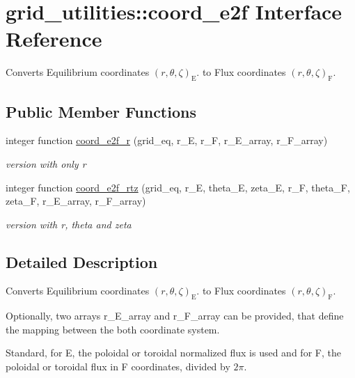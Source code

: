 \hypertarget{interfacegrid__utilities_1_1coord__e2f}{}\section{grid\+\_\+utilities\+:\+:coord\+\_\+e2f Interface Reference}
\label{interfacegrid__utilities_1_1coord__e2f}


Converts Equilibrium coordinates $\left(r,\theta,\zeta\right)_\text{E}$. to Flux coordinates $\left(r,\theta,\zeta\right)_\text{F}$.  


\subsection*{Public Member Functions}
\begin{DoxyCompactItemize}
\item 
integer function \hyperlink{interfacegrid__utilities_1_1coord__e2f_a234992ee60b4bb51361a58522234a5cc}{coord\+\_\+e2f\+\_\+r} (grid\+\_\+eq, r\+\_\+E, r\+\_\+F, r\+\_\+\+E\+\_\+array, r\+\_\+\+F\+\_\+array)
\begin{DoxyCompactList}\small\item\em version with only r \end{DoxyCompactList}\item 
integer function \hyperlink{interfacegrid__utilities_1_1coord__e2f_aa4cc89261b595ef43acdb171c448e7d5}{coord\+\_\+e2f\+\_\+rtz} (grid\+\_\+eq, r\+\_\+E, theta\+\_\+E, zeta\+\_\+E, r\+\_\+F, theta\+\_\+F, zeta\+\_\+F, r\+\_\+\+E\+\_\+array, r\+\_\+\+F\+\_\+array)
\begin{DoxyCompactList}\small\item\em version with r, theta and zeta \end{DoxyCompactList}\end{DoxyCompactItemize}


\subsection{Detailed Description}
Converts Equilibrium coordinates $\left(r,\theta,\zeta\right)_\text{E}$. to Flux coordinates $\left(r,\theta,\zeta\right)_\text{F}$. 

Optionally, two arrays {\ttfamily r\+\_\+\+E\+\_\+array} and {\ttfamily r\+\_\+\+F\+\_\+array} can be provided, that define the mapping between the both coordinate system.

Standard, for E, the poloidal or toroidal normalized flux is used and for F, the poloidal or toroidal flux in F coordinates, divided by $2\pi$.

